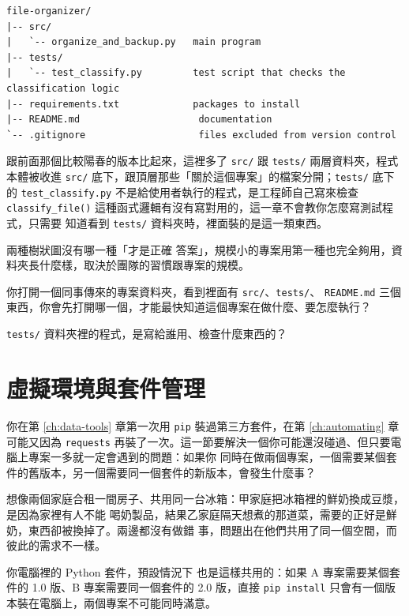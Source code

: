 \begin{verbatim}
file-organizer/
|-- src/
|   `-- organize_and_backup.py   main program
|-- tests/
|   `-- test_classify.py         test script that checks the classification logic
|-- requirements.txt             packages to install
|-- README.md                     documentation
`-- .gitignore                    files excluded from version control
\end{verbatim}

跟前面那個比較陽春的版本比起來，這裡多了 \texttt{src/} 跟 \texttt{tests/} 兩層資料夾，程式
本體被收進 \texttt{src/} 底下，跟頂層那些「關於這個專案」的檔案分開；\texttt{tests/} 底下的
\texttt{test\_classify.py} 不是給使用者執行的程式，是工程師自己寫來檢查
\texttt{classify\_file()} 這種函式邏輯有沒有寫對用的，這一章不會教你怎麼寫測試程式，只需要
知道看到 \texttt{tests/} 資料夾時，裡面裝的是這一類東西。

兩種樹狀圖沒有哪一種「才是正確
答案」，規模小的專案用第一種也完全夠用，資料夾長什麼樣，取決於團隊的習慣跟專案的規模。

\begin{drills}[label=drills:project-anatomy]
\item 你打開一個同事傳來的專案資料夾，看到裡面有 \texttt{src/}、\texttt{tests/}、
\texttt{README.md} 三個東西，你會先打開哪一個，才能最快知道這個專案在做什麼、要怎麼執行？
\item \texttt{tests/} 資料夾裡的程式，是寫給誰用、檢查什麼東西的？
\end{drills}

\section{虛擬環境與套件管理}
\label{sec:project-structure}

你在第 \ref{ch:data-tools} 章第一次用 \texttt{pip} 裝過第三方套件，在第 \ref{ch:automating} 章可能又因為 \texttt{requests}
再裝了一次。這一節要解決一個你可能還沒碰過、但只要電腦上專案一多就一定會遇到的問題：如果你
同時在做兩個專案，一個需要某個套件的舊版本，另一個需要同一個套件的新版本，會發生什麼事？

想像兩個家庭合租一間房子、共用同一台冰箱：甲家庭把冰箱裡的鮮奶換成豆漿，是因為家裡有人不能
喝奶製品，結果乙家庭隔天想煮的那道菜，需要的正好是鮮奶，東西卻被換掉了。兩邊都沒有做錯
事，問題出在他們共用了同一個空間，而彼此的需求不一樣。

你電腦裡的 Python 套件，預設情況下
也是這樣共用的：如果 A 專案需要某個套件的 1.0 版、B 專案需要同一個套件的 2.0 版，直接
\texttt{pip install} 只會有一個版本裝在電腦上，兩個專案不可能同時滿意。


